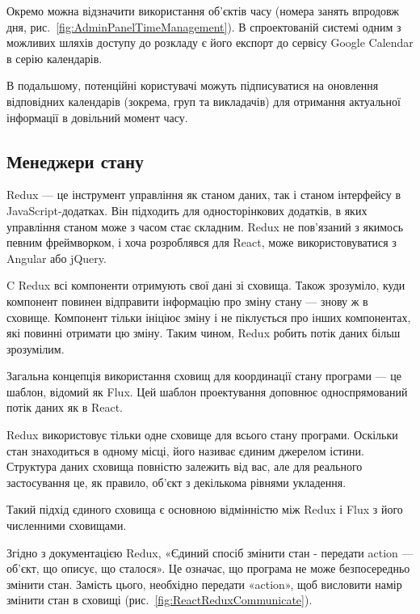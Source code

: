 
Окремо можна відзначити використання об’єктів часу (номера занять впродовж дня, рис.~\ref{fig:AdminPanelTimeManagement}).  В спроектованій системі одним з можливих шляхів доступу до розкладу є його експорт до сервісу Google Calendar в серію календарів. 


В подальшому, потенційні користувачі можуть підписуватися на оновлення відповідних календарів (зокрема, груп та викладачів) для отримання актуальної інформації в довільний момент часу.

\subsection{Менеджери стану}

Redux — це інструмент управління як станом даних, так і станом інтерфейсу в JavaScript-додатках. Він підходить для односторінкових додатків, в яких управління станом може з часом стає складним. Redux не пов'язаний з якимось певним фреймворком, і хоча розроблявся для React, може використовуватися з Angular або jQuery.

C Redux всі компоненти отримують свої дані зі сховища. Також зрозуміло, куди компонент повинен відправити інформацію про зміну стану — знову ж в сховище. Компонент тільки ініціює зміну і не піклується про інших компонентах, які повинні отримати цю зміну. Таким чином, Redux робить потік даних більш зрозумілим.

Загальна концепція використання сховищ для координації стану програми — це шаблон, відомий як Flux. Цей шаблон проектування доповнює односпрямований потік даних як в React.

Redux використовує тільки одне сховище для всього стану програми. Оскільки стан знаходиться в одному місці, його називає єдиним джерелом істини. Структура даних сховища повністю залежить від вас, але для реального застосування це, як правило, об'єкт з декількома рівнями укладення.

Такий підхід єдиного сховища є основною відмінністю між Redux і Flux з його численними сховищами.

Згідно з документацією Redux, «Єдиний спосіб змінити стан - передати action — об'єкт, що описує, що сталося». Це означає, що програма не може безпосередньо змінити стан. Замість цього, необхідно передати «action», щоб висловити намір змінити стан в сховищі (рис.~\ref{fig:ReactReduxCommunicate}).

